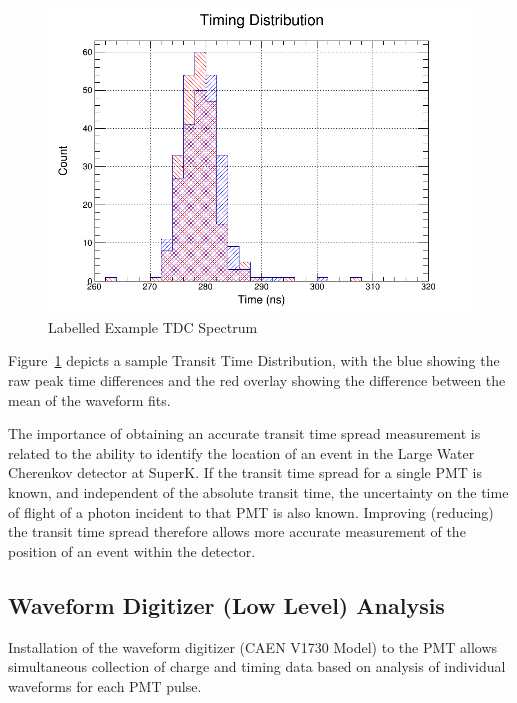 \documentclass[twoside,letterpaper]{refart}
\newcommand{\picwidth}{0.7 \textwidth}
\begin{document}
\FloatBarrier

\begin{figure}[!htpb]\centering
	\includegraphics[width=\picwidth]{images/tdcSpectrum.png}
	\caption{Labelled Example TDC Spectrum\label{tdcSpectrum}}
\end{figure}

\FloatBarrier

Figure~\ref{tdcSpectrum} depicts a sample Transit Time Distribution, with the blue showing the raw peak time differences and the red overlay showing the difference between the mean of the waveform fits.

The importance of obtaining an accurate transit time spread measurement is related to the ability to identify the location of an event in the Large Water Cherenkov detector at SuperK. If the transit time spread for a single PMT is known, and independent of the absolute transit time, the uncertainty on the time of flight of a photon incident to that PMT is also known. Improving (reducing) the transit time spread therefore allows more accurate measurement of the position of an event within the detector.

\clearpage

\subsection{Waveform Digitizer (Low Level) Analysis}



Installation of the waveform digitizer (CAEN V1730 Model) to the PMT allows simultaneous collection of charge and timing data based on analysis of individual waveforms for each PMT pulse.
\end{document}

